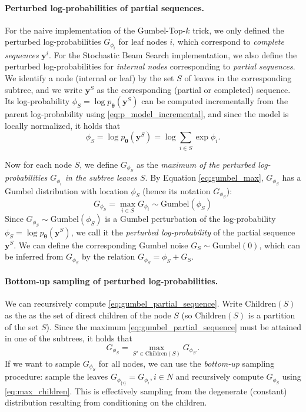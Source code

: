 \paragraph{Perturbed log-probabilities of partial sequences.}
For the naive implementation of the Gumbel-Top-$k$ trick, we  only defined the perturbed log-probabilities $G_{\phi_i}$ for leaf nodes $i$, which correspond to \emph{complete sequences} $\bm{y}^i$. For the Stochastic Beam Search implementation, we also define the perturbed log-probabilities for \emph{internal nodes} corresponding to \emph{partial sequences}. We identify a node (internal or leaf) by the set $S$ of leaves in the corresponding subtree, and we write $\bm{y}^S$ as the corresponding (partial or completed) sequence. Its log-probability $\phi_{S} = \log p_{\bm{\theta}}(\bm{y}^S)$ can be computed incrementally from the parent log-probability using \eqref{eq:p_model_incremental}, and since the model is locally normalized, it holds that
\begin{equation}
    \phi_{S} = \log p_{\bm{\theta}}(\bm{y}^S) = \log \sum\limits_{i \in S} \exp \phi_i.
\end{equation}

Now for each node $S$, we define $G_{\phi_S}$ as the \emph{maximum of the perturbed log-probabilities $G_{\phi_i}$ in the subtree leaves $S$}. By Equation \eqref{eq:gumbel_max}, $G_{\phi_S}$ has a Gumbel distribution with location $\phi_S$ (hence its notation $G_{\phi_S}$):
\begin{equation}
\label{eq:gumbel_partial_sequence}
    G_{\phi_S} = \max_{i \in S} G_{\phi_i}  \sim \text{Gumbel}(\phi_S)
\end{equation}
Since $G_{\phi_S} \sim \text{Gumbel}(\phi_S)$ is a Gumbel perturbation of the log-probability $\phi_S = \log p_{\bm{\theta}}(\bm{y}^S)$, we call it the \emph{perturbed log-probability} of the partial sequence $\bm{y}^S$. We can define the corresponding Gumbel noise $G_S \sim  \text{Gumbel}(0)$, which can be inferred from $G_{\phi_S}$ by the relation $G_{\phi_S} = \phi_S + G_S$.

\paragraph{Bottom-up sampling of perturbed log-probabilities.}
We can recursively compute \eqref{eq:gumbel_partial_sequence}. Write $\text{Children}(S)$ as the as the set of direct children of the node $S$ (so $\text{Children}(S)$ is a partition of the set $S$). Since the maximum \eqref{eq:gumbel_partial_sequence} must be attained in one of the subtrees, it holds that 
\begin{equation}
\label{eq:max_children}
    G_{\phi_S} = \max_{S' \in \text{Children}(S)} G_{\phi_{S'}}.
\end{equation}
If we want to sample $G_{\phi_S}$ for all nodes, we can use the \emph{bottom-up} sampling procedure: sample the leaves $G_{\phi_{\{i\}}} = G_{\phi_i}, i \in N$ and recursively compute $G_{\phi_S}$ using \eqref{eq:max_children}. This is effectively sampling from the degenerate (constant) distribution resulting from conditioning on the children.

